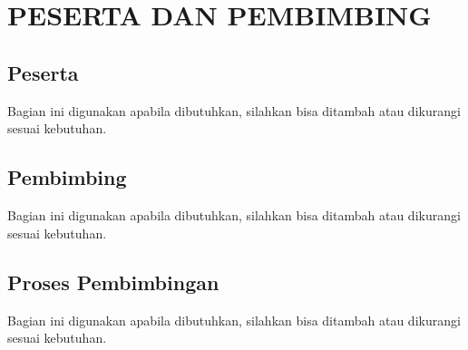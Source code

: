 
\chapter[PESERTA DAN PEMBIMBING]{\\ PESERTA DAN PEMBIMBING}

\section{Peserta}
Bagian ini digunakan apabila dibutuhkan, silahkan bisa ditambah atau dikurangi sesuai kebutuhan.

\section{Pembimbing}
Bagian ini digunakan apabila dibutuhkan, silahkan bisa ditambah atau dikurangi sesuai kebutuhan.

\section{Proses Pembimbingan}
Bagian ini digunakan apabila dibutuhkan, silahkan bisa ditambah atau dikurangi sesuai kebutuhan.